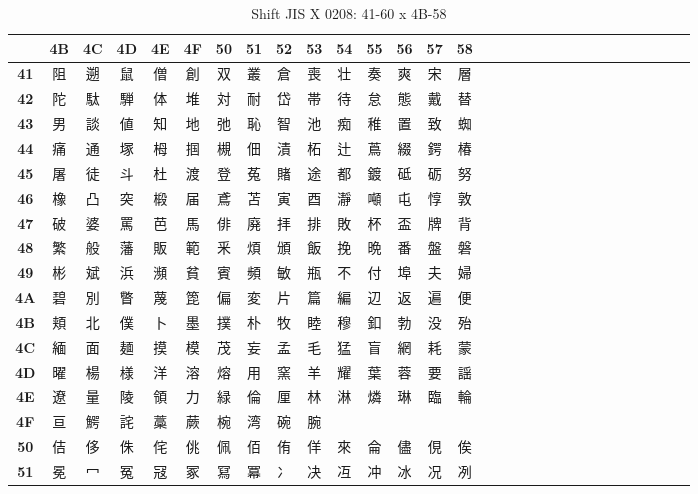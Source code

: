 \begin{table}[H]
\centering
\caption{Shift JIS X 0208: 41-60 x 4B-58}
\begin{tabular}{|Sc|Sc|Sc|Sc|Sc|Sc|Sc|Sc|Sc|Sc|Sc|Sc|Sc|Sc|Sc|}
\hline
 & \textbf{4B} & \textbf{4C} & \textbf{4D} & \textbf{4E} & \textbf{4F} & \textbf{50} & \textbf{51} & \textbf{52} & \textbf{53} & \textbf{54} & \textbf{55} & \textbf{56} & \textbf{57} & \textbf{58} \\ \hline
\textbf{41} & 阻 & 遡 & 鼠 & 僧 & 創 & 双 & 叢 & 倉 & 喪 & 壮 & 奏 & 爽 & 宋 & 層 \\ \hline
\textbf{42} & 陀 & 駄 & 騨 & 体 & 堆 & 対 & 耐 & 岱 & 帯 & 待 & 怠 & 態 & 戴 & 替 \\ \hline
\textbf{43} & 男 & 談 & 値 & 知 & 地 & 弛 & 恥 & 智 & 池 & 痴 & 稚 & 置 & 致 & 蜘 \\ \hline
\textbf{44} & 痛 & 通 & 塚 & 栂 & 掴 & 槻 & 佃 & 漬 & 柘 & 辻 & 蔦 & 綴 & 鍔 & 椿 \\ \hline
\textbf{45} & 屠 & 徒 & 斗 & 杜 & 渡 & 登 & 菟 & 賭 & 途 & 都 & 鍍 & 砥 & 砺 & 努 \\ \hline
\textbf{46} & 橡 & 凸 & 突 & 椴 & 届 & 鳶 & 苫 & 寅 & 酉 & 瀞 & 噸 & 屯 & 惇 & 敦 \\ \hline
\textbf{47} & 破 & 婆 & 罵 & 芭 & 馬 & 俳 & 廃 & 拝 & 排 & 敗 & 杯 & 盃 & 牌 & 背 \\ \hline
\textbf{48} & 繁 & 般 & 藩 & 販 & 範 & 釆 & 煩 & 頒 & 飯 & 挽 & 晩 & 番 & 盤 & 磐 \\ \hline
\textbf{49} & 彬 & 斌 & 浜 & 瀕 & 貧 & 賓 & 頻 & 敏 & 瓶 & 不 & 付 & 埠 & 夫 & 婦 \\ \hline
\textbf{4A} & 碧 & 別 & 瞥 & 蔑 & 箆 & 偏 & 変 & 片 & 篇 & 編 & 辺 & 返 & 遍 & 便 \\ \hline
\textbf{4B} & 頬 & 北 & 僕 & 卜 & 墨 & 撲 & 朴 & 牧 & 睦 & 穆 & 釦 & 勃 & 没 & 殆 \\ \hline
\textbf{4C} & 緬 & 面 & 麺 & 摸 & 模 & 茂 & 妄 & 孟 & 毛 & 猛 & 盲 & 網 & 耗 & 蒙 \\ \hline
\textbf{4D} & 曜 & 楊 & 様 & 洋 & 溶 & 熔 & 用 & 窯 & 羊 & 耀 & 葉 & 蓉 & 要 & 謡 \\ \hline
\textbf{4E} & 遼 & 量 & 陵 & 領 & 力 & 緑 & 倫 & 厘 & 林 & 淋 & 燐 & 琳 & 臨 & 輪 \\ \hline
\textbf{4F} & 亘 & 鰐 & 詫 & 藁 & 蕨 & 椀 & 湾 & 碗 & 腕 &  &  &  &  &  \\ \hline
\textbf{50} & 佶 & 侈 & 侏 & 侘 & 佻 & 佩 & 佰 & 侑 & 佯 & 來 & 侖 & 儘 & 俔 & 俟 \\ \hline
\textbf{51} & 冕 & 冖 & 冤 & 冦 & 冢 & 冩 & 冪 & 冫 & 决 & 冱 & 冲 & 冰 & 况 & 冽 \\ \hline

\end{tabular}
\end{table}
